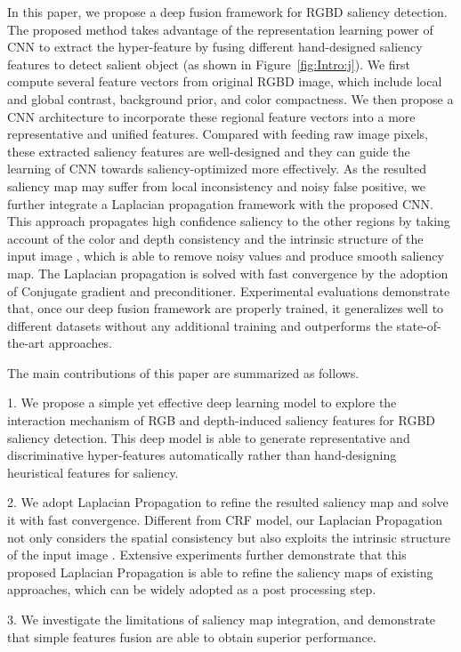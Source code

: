\documentclass[journal]{IEEEtran}
\begin{document}
In this paper, we propose a deep fusion framework for RGBD saliency detection. The proposed method takes advantage of the representation learning power of CNN to extract the hyper-feature by fusing different hand-designed saliency features to detect salient object (as shown in Figure~\ref{fig:Intro:j}). We first compute several feature vectors from original RGBD image, which include local and global contrast, background prior, and color compactness. We then propose a CNN architecture to incorporate these regional feature vectors into a more representative and unified features. Compared with feeding raw image pixels, these extracted saliency features are well-designed and they can guide the learning of CNN towards saliency-optimized more effectively. As the resulted saliency map may suffer from local inconsistency and noisy false positive, we further integrate a Laplacian propagation framework with the proposed CNN. This approach propagates high confidence saliency to the other regions by taking account of the color and depth consistency and the intrinsic structure of the input image \cite{zhou2004learning}, which is able to remove noisy values and produce smooth saliency map. The Laplacian propagation is solved with fast convergence by the adoption of Conjugate gradient and preconditioner. Experimental evaluations demonstrate that, once our deep fusion framework are properly trained, it generalizes well to different datasets without any additional training and outperforms the state-of-the-art approaches.

The main contributions of this paper are summarized as follows.

1. We propose a simple yet effective deep learning model to explore the interaction mechanism of RGB and depth-induced saliency features for RGBD saliency detection. This deep model is able to generate representative and discriminative hyper-features automatically rather than hand-designing heuristical features for saliency. 

2. We adopt Laplacian Propagation to refine the resulted saliency map and solve it with fast convergence.
Different from CRF model, our Laplacian Propagation not only considers the spatial consistency but also exploits the intrinsic structure of the input image \cite{zhou2004learning}. Extensive experiments further demonstrate that this proposed Laplacian Propagation is able to refine the saliency maps of existing approaches, which can be widely adopted as a post processing step.

3. We investigate the limitations of saliency map integration, and demonstrate that simple features fusion are able to obtain superior performance.
\end{document}
